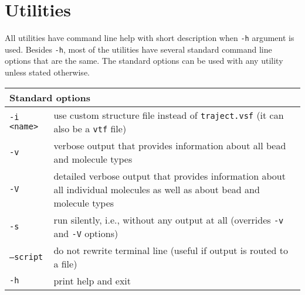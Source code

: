\chapter{Utilities} \label{chap:Utils}

All utilities have command line help with short description when
\texttt{-h} argument is used. Besides \texttt{-h}, most of the utilities
have several standard command line options that are the same. The standard
options can be used with any utility unless stated otherwise.

\vspace{1em}
\noindent
\begin{tabular}{p{}p{}}
  \toprule
  \multicolumn{2}{l}{Standard options} \\
  \midrule
  \texttt{-i <name>} & use custom structure file instead of
    \texttt{traject.vsf} (it can also be a \texttt{vtf} file) \\
  \texttt{-v}        & verbose output that provides information about all
    bead and molecule types \\
  \texttt{-V}        & detailed verbose output that provides
    information about all individual molecules as well as about bead and
    molecule types \\
  \texttt{-s}        & run silently, i.e., without any output at all
    (overrides \texttt{-v} and \texttt{-V} options) \\
  \texttt{--script}  & do not rewrite terminal line (useful if output is
    routed to a file) \\
  \texttt{-h}        & print help and exit \\
  \bottomrule
\end{tabular}












%












